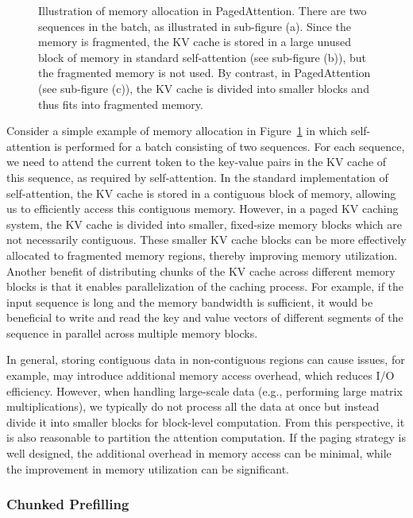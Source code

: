 \begin{figure}[!t]
\centering

\vspace{-0.5cm} \caption{Illustration of memory allocation in PagedAttention. There are two sequences in the batch, as illustrated in sub-figure (a). Since the memory is fragmented, the KV cache is stored in a large unused block of memory in standard self-attention (see sub-figure (b)), but the fragmented memory is not used. By contrast, in PagedAttention (see sub-figure (c)), the KV cache is divided into smaller blocks and thus fits into fragmented memory.}
\label{fig:llm-paged-attention-example}
\end{figure}

Consider a simple example of memory allocation in Figure~\ref{fig:llm-paged-attention-example} in which self-attention is performed for a batch consisting of two sequences. For each sequence, we need to attend the current token to the key-value pairs in the KV cache of this sequence, as required by self-attention. In the standard implementation of self-attention, the KV cache is stored in a contiguous block of memory, allowing us to efficiently access this contiguous memory. However, in a paged KV caching system, the KV cache is divided into smaller, fixed-size memory blocks which are not necessarily contiguous. These smaller KV cache blocks can be more effectively allocated to fragmented memory regions, thereby improving memory utilization. Another benefit of distributing chunks of the KV cache across different memory blocks is that it enables parallelization of the caching process. For example, if the input sequence is long and the memory bandwidth is sufficient, it would be beneficial to write and read the key and value vectors of different segments of the sequence in parallel across multiple memory blocks.

In general, storing contiguous data in non-contiguous regions can cause issues, for example, may introduce additional memory access overhead, which reduces I/O efficiency. However, when handling large-scale data (e.g., performing large matrix multiplications), we typically do not process all the data at once but instead divide it into smaller blocks for block-level computation. From this perspective, it is also reasonable to partition the attention computation. If the paging strategy is well designed, the additional overhead in memory access can be minimal, while the improvement in memory utilization can be significant.

\subsubsection{Chunked Prefilling}

